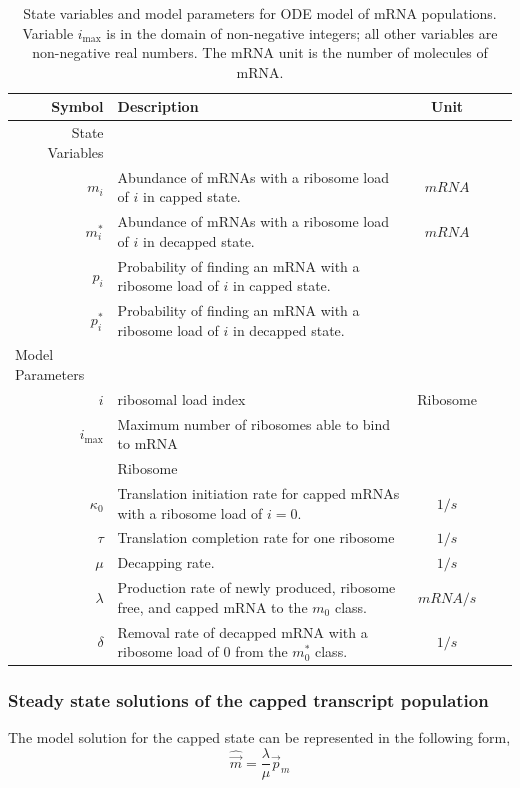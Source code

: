 \documentclass[a4,center,fleqn,nocrop]{NAR}
\newcommand{\imax}{\ensuremath{{i_{\max}}}\xspace}
\newcommand{\mvec}{\ensuremath{\vec{m}}\xspace}
\newcommand{\mvechat}{\ensuremath{\hat{\mvec}}\xspace}
\begin{document}
\begin{table}[!ht]
\begin{center}
\begin{tabular}{|rp{4in}|c|c|c|}\hline
\textbf{Symbol}&\textbf{Description}&\textbf{Unit} \\\hline
State Variables & &  \\ \hline
$m_i$ & Abundance of mRNAs with a ribosome load of $i$ in capped state. & $mRNA$ \\
$m_i^*$ & Abundance of mRNAs with a ribosome load of $i$ in decapped state. & $mRNA$ \\ \hline
$p_i$ & Probability of finding an mRNA with a ribosome load of $i$ in capped state. & \\
$p_i^*$ & Probability of finding an mRNA with a ribosome load of $i$ in decapped state. &  \\ \hline
\multicolumn{1}{l}{Model Parameters} \\ \hline
$i$ & ribosomal load index & Ribosome\\
 \imax & Maximum number of ribosomes able to bind to mRNA\\ & Ribosome \\
$\kappa_0$ & Translation initiation rate for capped mRNAs with a ribosome load of $i=0$. & $1/s$\\
$\tau$ & Translation completion rate for one ribosome & $1/s$\\
$\mu $ & Decapping rate. & $1/s$\\
$\lambda$ & Production rate of newly produced, ribosome free, and capped mRNA to the $m_0$ class. & $mRNA/s$\\
$\delta$ & Removal rate of decapped mRNA with a ribosome load of 0 from the $m_0^*$ class. & $1/s$\\ \hline 
\end{tabular}
\caption{State variables and model parameters for ODE model of mRNA populations.
Variable \imax is in the domain of non-negative integers; all other variables are non-negative real numbers.
The mRNA unit is the number of molecules of mRNA.}
\label{tab:params}
\end{center}
\end{table}


\subsubsection{Steady state solutions of the capped transcript population}
 The model solution for the capped state can be represented in the following form,
	\begin{equation} \label{eq:capped_solution}
		\mvechat=\frac{\lambda}{\mu}\vec{p}_m
	\end{equation}
\end{document}
